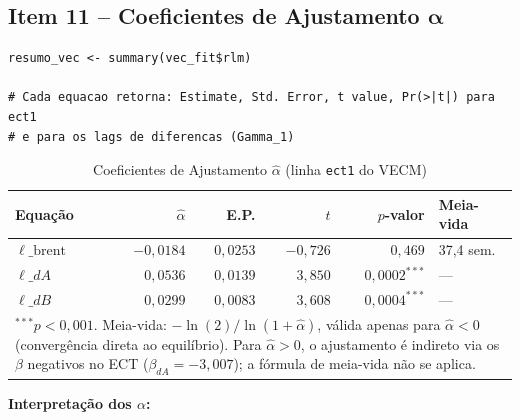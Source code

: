 \documentclass[12pt,a4paper]{article}
\begin{document}
\subsection{Item 11 -- Coeficientes de Ajustamento $\boldsymbol{\alpha}$}

\begin{lstlisting}[caption={Extração dos coeficientes alpha do VECM}]
resumo_vec <- summary(vec_fit$rlm)

# Cada equacao retorna: Estimate, Std. Error, t value, Pr(>|t|) para ect1
# e para os lags de diferencas (Gamma_1)
\end{lstlisting}

\begin{table}[H]
\centering
\caption{Coeficientes de Ajustamento $\hat{\alpha}$ (linha \texttt{ect1} do VECM)}
\label{tab:alpha}
\begin{tabular}{lrrrrl}
\toprule
Equação & $\hat{\alpha}$ & E.P. & $t$ & $p$-valor & Meia-vida \\
\midrule
$\ell\_\text{brent}$ & $-0{,}0184$ & $0{,}0253$ & $-0{,}726$ & $0{,}469$ & 37,4 sem. \\
$\ell\_dA$           & $\phantom{-}0{,}0536$ & $0{,}0139$ & $3{,}850$ & $0{,}0002^{***}$ & --- \\
$\ell\_dB$           & $\phantom{-}0{,}0299$ & $0{,}0083$ & $3{,}608$ & $0{,}0004^{***}$ & --- \\
\bottomrule
\multicolumn{6}{p{0.85\linewidth}}{\small $^{***}p < 0{,}001$.
  Meia-vida: $-\ln(2)/\ln(1+\hat{\alpha})$, válida apenas para $\hat{\alpha} < 0$
  (convergência direta ao equilíbrio).
  Para $\hat{\alpha} > 0$, o ajustamento é indireto via os $\beta$ negativos no ECT
  ($\beta_{dA} = -3{,}007$); a fórmula de meia-vida não se aplica.}
\end{tabular}
\end{table}

\noindent
\textbf{Interpretação dos $\alpha$:}
\end{document}
